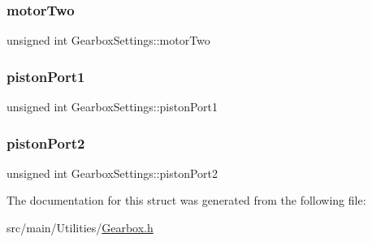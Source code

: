 \subsubsection{\texorpdfstring{motor\+Two}{motorTwo}}
{\footnotesize\ttfamily unsigned int Gearbox\+Settings\+::motor\+Two}

\mbox{\label{structGearboxSettings_aef05348dd1e0aa46face95b11f66faa3}} 
\subsubsection{\texorpdfstring{piston\+Port1}{pistonPort1}}
{\footnotesize\ttfamily unsigned int Gearbox\+Settings\+::piston\+Port1}

\mbox{\label{structGearboxSettings_ab3d3ea38cd44aea229c7aaccf537ab0b}} 
\subsubsection{\texorpdfstring{piston\+Port2}{pistonPort2}}
{\footnotesize\ttfamily unsigned int Gearbox\+Settings\+::piston\+Port2}



The documentation for this struct was generated from the following file\+:\begin{DoxyCompactItemize}
\item 
src/main/\+Utilities/\hyperlink{Gearbox_8h}{Gearbox.\+h}\end{DoxyCompactItemize}
